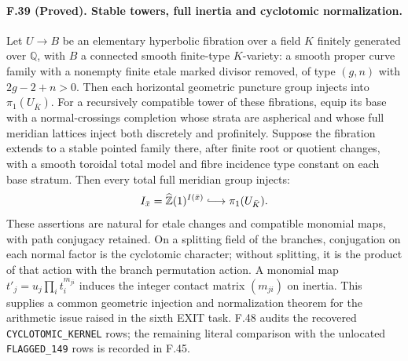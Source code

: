 \paragraph{F.39 (Proved). Stable towers, full inertia and cyclotomic normalization.}
Let $U\to B$ be an elementary hyperbolic fibration over a field $K$
finitely generated over $\mathbb Q$, with $B$ a connected smooth
finite-type $K$-variety: a smooth proper curve family with
a nonempty finite etale marked divisor removed, of type $(g,n)$ with
$2g-2+n>0$. Then each horizontal geometric puncture group injects into
$\pi_1(U_{\bar K})$. For a recursively compatible tower of these
fibrations, equip its base with a normal-crossings completion whose
strata are aspherical and whose full meridian lattices inject both
discretely and profinitely. Suppose the fibration extends to a stable
pointed family there, after finite root or quotient changes, with a
smooth toroidal total model and fibre incidence type constant on each
base stratum. Then every total full meridian group injects:
\[
 I_{\bar x}=\widehat{\mathbb Z}(1)^{I(\bar x)}
       \lhook\joinrel\longrightarrow\pi_1(U_{\bar K}).
\]
These assertions are natural for etale changes and compatible monomial
maps, with path conjugacy retained. On a splitting field of the
branches, conjugation on each normal factor is the cyclotomic character;
without splitting, it is the product of that action with the branch
permutation action. A monomial map $t'_j=u_j\prod_i t_i^{m_{ji}}$ induces
the integer contact matrix $(m_{ji})$ on inertia. This supplies a common
geometric injection and normalization theorem for the arithmetic issue
raised in the sixth EXIT task. F.48 audits the recovered
\texttt{CYCLOTOMIC\_KERNEL} rows; the remaining literal comparison
with the unlocated \texttt{FLAGGED\_149} rows is recorded in F.45.

